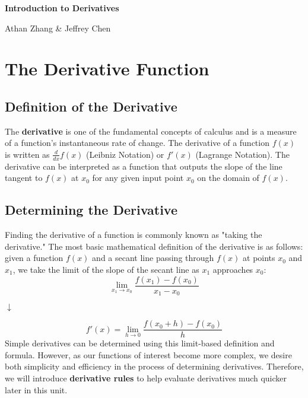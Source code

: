 \documentclass[11pt]{article}
\begin{document}
\textbf{\Huge Introduction to Derivatives}

Athan Zhang \& Jeffrey Chen

\section{The Derivative Function}

\subsection{Definition of the Derivative}
The \textbf{derivative} is one of the fundamental concepts of calculus and is a measure of a function's instantaneous rate of change. The derivative of a function $f(x)$ is written as $\frac{d}{dx}f(x)$ (Leibniz Notation) or $f'(x)$ (Lagrange Notation). The derivative can be interpreted as a function that outputs the slope of the line tangent to $f(x)$ at $x_0$ for any given input point $x_0$ on the domain of $f(x)$.

\begin{center}
\end{center}

\subsection{Determining the Derivative}
Finding the derivative of a function is commonly known as "taking the derivative." The most basic mathematical definition of the derivative is as follows: given a function $f(x)$ and a secant line passing through $f(x)$ at points $x_0$ and $x_1$, we take the limit of the slope of the secant line as $x_1$ approaches $x_0$:
\[\lim_{x_1 \to x_0} \frac{f(x_1)-f(x_0)}{x_1-x_0}\]
\begin{center}
$\downarrow$
\end{center}
\[f'(x) = \lim_{h \to 0} \frac{f(x_0+h)-f(x_0)}{h}\]
Simple derivatives can be determined using this limit-based definition and formula. However, as our functions of interest become more complex, we desire both simplicity and efficiency in the process of determining derivatives. Therefore, we will introduce \textbf{derivative rules} to help evaluate derivatives much quicker later in this unit.
\end{document}
